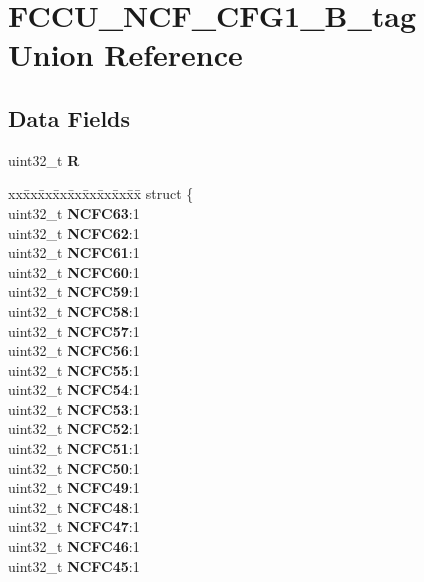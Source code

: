 \hypertarget{unionFCCU__NCF__CFG1__32B__tag}{}\section{F\+C\+C\+U\+\_\+\+N\+C\+F\+\_\+\+C\+F\+G1\+\_\+B\+\_\+tag Union Reference}
\label{unionFCCU__NCF__CFG1__32B__tag}
\subsection*{Data Fields}
\begin{DoxyCompactItemize}
\item 
\mbox{\label{unionFCCU__NCF__CFG1__32B__tag_adb735a98127e2b1885550493c43ad953}} 
uint32\+\_\+t {\bfseries R}
\item 
\mbox{\label{unionFCCU__NCF__CFG1__32B__tag_a4fe6b6f97218edb241d7890a7eac4d4c}} 
\begin{tabbing}
xx\=xx\=xx\=xx\=xx\=xx\=xx\=xx\=xx\=\kill
struct \{\\
\>uint32\_t {\bfseries NCFC63}:1\\
\>uint32\_t {\bfseries NCFC62}:1\\
\>uint32\_t {\bfseries NCFC61}:1\\
\>uint32\_t {\bfseries NCFC60}:1\\
\>uint32\_t {\bfseries NCFC59}:1\\
\>uint32\_t {\bfseries NCFC58}:1\\
\>uint32\_t {\bfseries NCFC57}:1\\
\>uint32\_t {\bfseries NCFC56}:1\\
\>uint32\_t {\bfseries NCFC55}:1\\
\>uint32\_t {\bfseries NCFC54}:1\\
\>uint32\_t {\bfseries NCFC53}:1\\
\>uint32\_t {\bfseries NCFC52}:1\\
\>uint32\_t {\bfseries NCFC51}:1\\
\>uint32\_t {\bfseries NCFC50}:1\\
\>uint32\_t {\bfseries NCFC49}:1\\
\>uint32\_t {\bfseries NCFC48}:1\\
\>uint32\_t {\bfseries NCFC47}:1\\
\>uint32\_t {\bfseries NCFC46}:1\\
\>uint32\_t {\bfseries NCFC45}:1\\

\end{tabbing}
\end{DoxyCompactItemize}
